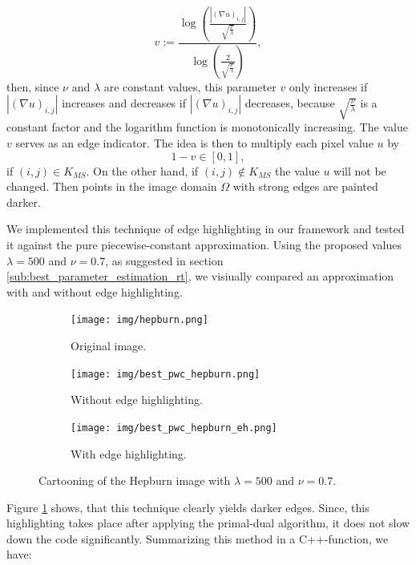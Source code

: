 \documentclass{scrreprt}
\begin{document}
                $$
                    v := \frac{\log \left( \frac{|(\nabla u)_{i,j}|}{\sqrt{\frac{\nu}{\lambda}}} \right)}{\log \left( \frac{2}{\sqrt{\frac{\nu}{\lambda}}} \right)},
                $$
            then, since $\nu$ and $\lambda$ are constant values, this parameter $v$ only increases if $|(\nabla u)_{i,j}|$ increases and decreases if $|(\nabla u)_{i,j}|$ decreases, because $\sqrt{\frac{\nu}{\lambda}}$ is a constant factor and the logarithm function is monotonically increasing. The value $v$ serves as an edge indicator. The idea is then to multiply each pixel value $u$ by
                $$
                    1 - v \in [0, 1],
                $$
            if $(i, j) \in K_{MS}$. On the other hand, if $(i, j) \notin K_{MS}$ the value $u$ will not be changed. Then points in the image domain $\Omega$ with strong edges are painted darker.

            We implemented this technique of edge highlighting in our framework and tested it against the pure piecewise-constant approximation. Using the proposed values $\lambda = 500$ and $\nu = 0.7$, as suggested in section \ref{sub:best_parameter_estimation_rt}, we visiually compared an approximation with and without edge highlighting.

            \begin{figure}[!ht]
                \centering
                \begin{subfigure}[b]{0.32\textwidth}
                    \texttt{[image: img/hepburn.png]}
                    \caption{Original image.}
                \end{subfigure}
                \begin{subfigure}[b]{0.32\textwidth}
                    \texttt{[image: img/best\_pwc\_hepburn.png]}
                    \caption{Without edge highlighting.}
                \end{subfigure}
                \begin{subfigure}[b]{0.32\textwidth}
                    \texttt{[image: img/best\_pwc\_hepburn\_eh.png]}
                    \caption{With edge highlighting.}
                \end{subfigure}
                \caption[Cartooning example of Audrey Hepburn.]{Cartooning of the Hepburn image with $\lambda = 500$ and $\nu = 0.7$.}
            \label{fig:cartooning_hepburn_realtime}
            \end{figure}

        Figure \ref{fig:cartooning_hepburn_realtime} shows, that this technique clearly yields darker edges. Since, this highlighting takes place after applying the primal-dual algorithm, it does not slow down the code significantly. Summarizing this method in a C++-function, we have:
\end{document}

